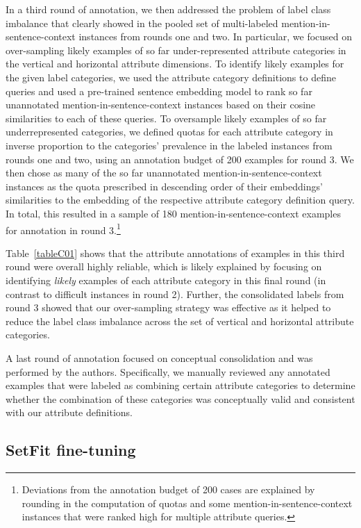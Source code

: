 \documentclass[12pt]{article}
\begin{document}
In a third round of annotation, we then addressed the problem of label class imbalance that clearly showed in the pooled set of multi-labeled mention-in-sentence-context instances from rounds one and two.
In particular, we focused on over-sampling likely examples of so far under-represented attribute categories in the vertical and horizontal attribute dimensions.
To identify likely examples for the given label categories, we used the attribute category definitions to define queries and used a pre-trained sentence embedding model to rank so far unannotated mention-in-sentence-context instances based on their cosine similarities to each of these queries.
To oversample likely examples of so far underrepresented categories, we defined quotas for each attribute category in inverse proportion to the categories' prevalence in the labeled instances from rounds one and two, using an annotation budget of 200 examples for round 3.
We then chose as many of the so far unannotated mention-in-sentence-context instances as the quota prescribed in descending order of their embeddings' similarities to the embedding of the respective attribute category definition query.
In total, this resulted in a sample of 180 mention-in-sentence-context examples for annotation in round 3.\footnote{Deviations from the annotation budget of 200 cases are explained by rounding in the computation of quotas and some mention-in-sentence-context instances that were ranked high for multiple attribute queries.}

Table~\ref{tableC01} shows that the attribute annotations of examples in this third round were overall highly reliable, which is likely explained by focusing on identifying \emph{likely} examples of each attribute category in this final round (in contrast to difficult instances in round 2).
Further, the consolidated labels from round 3 showed that our over-sampling strategy was effective as it helped to reduce the label class imbalance across the set of vertical and horizontal attribute categories.

A last round of annotation focused on conceptual consolidation and was performed by the authors.
Specifically, we manually reviewed any annotated examples that were labeled as combining certain attribute categories to determine whether the combination of these categories was conceptually valid and consistent with our attribute definitions.

\subsection{SetFit fine-tuning}\label{sec-apx_setfit}
\end{document}
